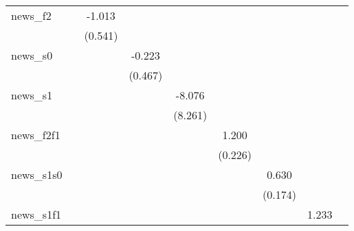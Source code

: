 {\begin{tabular}{l*{8}{c}}
\addlinespace
news\_f2     &                     &      -1.013\sym{*}  &                     &                     &                     &                     &                     &                     \\
            &                     &     (0.541)         &                     &                     &                     &                     &                     &                     \\
\addlinespace
news\_s0     &                     &                     &      -0.223         &                     &                     &                     &                     &                     \\
            &                     &                     &     (0.467)         &                     &                     &                     &                     &                     \\
\addlinespace
news\_s1     &                     &                     &                     &      -8.076         &                     &                     &                     &                     \\
            &                     &                     &                     &     (8.261)         &                     &                     &                     &                     \\
\addlinespace
news\_f2f1   &                     &                     &                     &                     &       1.200\sym{***}&                     &                     &                     \\
            &                     &                     &                     &                     &     (0.226)         &                     &                     &                     \\
\addlinespace
news\_s1s0   &                     &                     &                     &                     &                     &       0.630\sym{***}&                     &                     \\
            &                     &                     &                     &                     &                     &     (0.174)         &                     &                     \\
\addlinespace
news\_s1f1   &                     &                     &                     &                     &                     &                     &       1.233\sym{***}&                     \\

\end{tabular}}
